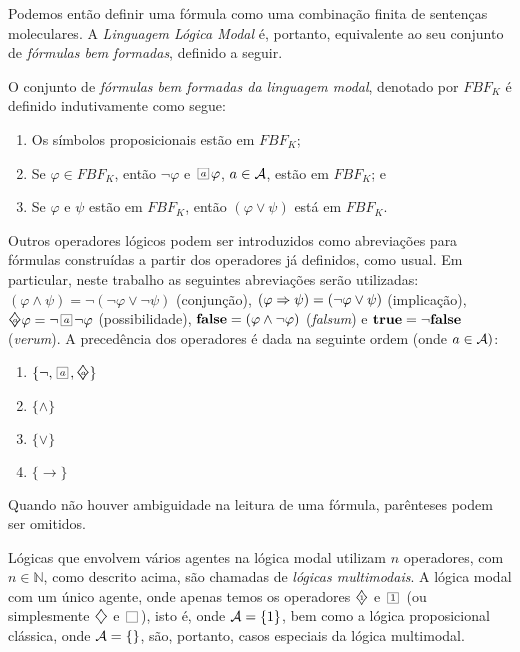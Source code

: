 Podemos então definir uma fórmula como uma combinação finita de sentenças
moleculares. A \textit{Linguagem Lógica Modal} é, portanto, equivalente ao seu
conjunto de \textit{fórmulas bem formadas}, definido a seguir.

\begin{definition} O conjunto de \textit{fórmulas bem formadas da linguagem modal}, denotado por
$FBF_{K}$ é definido indutivamente como segue:
    \label{def:fbf}

    \begin{enumerate}
    \item Os símbolos proposicionais estão em $FBF_{K}$;
    \item Se $\varphi \in FBF_{K}$, então $\neg \varphi$ e $\nec{\agent}\varphi$, $a \in {\cal{A}}$, estão em $FBF_{K}$; e
    \item Se $\varphi$ e $\psi$ estão em $FBF_{K}$, então $(\varphi \vee \psi)$ está em $FBF_{K}$.
    \end{enumerate}
    
\label{def:fbf}
\end{definition}

Outros operadores lógicos podem ser introduzidos como abreviações para fórmulas
construídas a partir dos operadores já definidos, como usual. Em particular,
neste trabalho as seguintes abreviações serão utilizadas: $(\varphi \land \psi)
= \neg (\neg \varphi \lor \neg \psi)$ (conjunção), $(\varphi \Rightarrow \psi) = (\neg
\varphi \lor \psi)$ (implicação), $\pos{\agent} \varphi= \neg \nec{\agent} \neg
\varphi$ (possibilidade), $\mbox{\rm\bf false} = (\varphi \land \neg \varphi)$
(\emph{falsum}) e $\mbox{\rm\bf true} = \neg \mbox{\rm\bf false}$ (\emph{verum}). A precedência dos
operadores é dada na seguinte ordem (onde $a \in {\cal{A}})$:
\begin{enumerate} 
    \item $\{\neg, \nec{\agent}, \pos{\agent}\}$ 
    \item $\{\wedge\}$ 
    \item $\{\vee\}$ 
    \item $\{\rightarrow\}$ 
\end{enumerate}

Quando não houver ambiguidade na leitura de uma fórmula, parênteses podem ser
omitidos.

Lógicas que envolvem vários agentes na lógica modal utilizam $n$ operadores, com
$n \in \mathbb{N}$, como descrito acima, são chamadas de \emph{lógicas
multimodais}. A lógica modal com um único agente, onde apenas temos os
operadores $\pos{1}$ e $\nec{1}$ (ou simplesmente $\pos{}$ e $\nec{}$), isto é,
onde ${\cal{A}} =\{1\}$, bem como a lógica proposicional clássica, onde ${\cal{A}} =
\{\}$, são, portanto, casos especiais da lógica multimodal.

